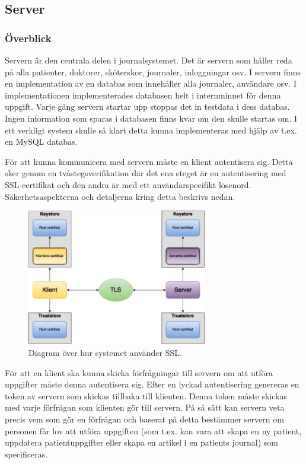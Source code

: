 \documentclass[a4paper]{article}
\begin{document}
\subsection{Server}
\subsubsection{Överblick}
Servern är den centrala delen i journalsystemet. Det är servern som håller reda på alla patienter, doktorer, sköterskor, journaler, inloggningar osv. I servern finns en implementation av en databas som innehåller alla journaler, användare osv. I implementationen implementerades databasen helt i internminnet för denna uppgift. Varje gång servern startar upp stoppas det in testdata i dess databas. Ingen information som sparas i databasen finns kvar om den skulle startas om. I ett verkligt system skulle så klart detta kunna implementeras med hjälp av t.ex. en MySQL databas. 

För att kunna kommunicera med servern måste en klient autentisera sig. Detta sker genom en tvåstegsverifikation där det ena steget är en autentisering med SSL-certifikat och den andra är med ett användarspecifikt lösenord. Säkerhetsaspekterna och detaljerna kring detta beskrivs nedan.

\begin{figure}[H]
	\centering
	\includegraphics[width=0.7\textwidth]{sslcon.png}
	\caption{Diagram över hur systemet använder SSL.}	
	\label{bild}
\end{figure}

För att en klient ska kunna skicka förfrågningar till servern om att utföra uppgifter måste denna autentisera sig. Efter en lyckad autentisering genereras en token av servern som skickas tillbaka till klienten. Denna token måste skickas med varje förfrågan som klienten gör till servern. På så sätt kan servern veta precis vem som gör en förfrågan och baserat på detta bestämmer servern om personen får lov att utföra uppgiften (som t.ex. kan vara att skapa en ny patient, uppdatera patientuppgifter eller skapa en artikel i en patients journal) som specificeras.
\end{document}

